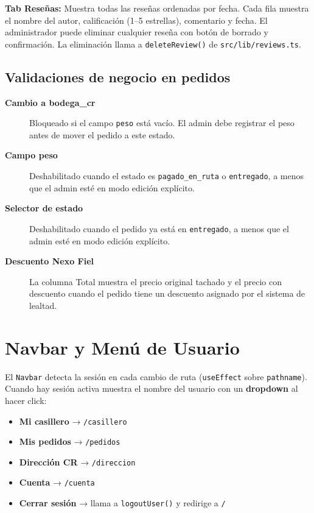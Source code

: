 \documentclass[12pt,a4paper]{article}
\begin{document}
\begin{nexobox}
\textbf{Tab Reseñas:} Muestra todas las reseñas ordenadas por fecha. Cada fila
muestra el nombre del autor, calificación (1--5 estrellas), comentario y fecha.
El administrador puede eliminar cualquier reseña con botón de borrado y confirmación.
La eliminación llama a \texttt{deleteReview()} de \texttt{src/lib/reviews.ts}.
\end{nexobox}

\subsection{Validaciones de negocio en pedidos}

\begin{description}
  \item[\textbf{Cambio a bodega\_cr}] Bloqueado si el campo \texttt{peso} está vacío.
    El admin debe registrar el peso antes de mover el pedido a este estado.
  \item[\textbf{Campo peso}] Deshabilitado cuando el estado es \texttt{pagado\_en\_ruta}
    o \texttt{entregado}, a menos que el admin esté en modo edición explícito.
  \item[\textbf{Selector de estado}] Deshabilitado cuando el pedido ya está en
    \texttt{entregado}, a menos que el admin esté en modo edición explícito.
  \item[\textbf{Descuento Nexo Fiel}] La columna Total muestra el precio original tachado
    y el precio con descuento cuando el pedido tiene un descuento asignado por el sistema de lealtad.
\end{description}

\section{Navbar y Menú de Usuario}

El \texttt{Navbar} detecta la sesión en cada cambio de ruta (\texttt{useEffect} sobre
\texttt{pathname}). Cuando hay sesión activa muestra el nombre del usuario con un
\textbf{dropdown} al hacer click:

\begin{itemize}
  \item \textbf{Mi casillero} → \texttt{/casillero}
  \item \textbf{Mis pedidos} → \texttt{/pedidos}
  \item \textbf{Dirección CR} → \texttt{/direccion}
  \item \textbf{Cuenta} → \texttt{/cuenta}
  \item \textbf{Cerrar sesión} → llama a \texttt{logoutUser()} y redirige a \texttt{/}
\end{itemize}
\end{document}
